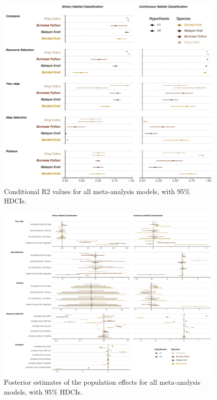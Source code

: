 \documentclass[10pt,a4paper]{article}
\begin{document}
\begin{figure}
\includegraphics[width=1\linewidth]{../../figures/r2Plot} \caption{Conditional R2 values for all meta-analysis models, with 95\% HDCIs.}\label{fig:metaR2Plot}
\end{figure}

\begin{figure}
\includegraphics[width=1\linewidth]{../../figures/metaBeta} \caption{Posterior estimates of the population effects for all meta-analysis models, with 95\% HDCIs.}\label{fig:metaBetasPlot}
\end{figure}
\end{document}
